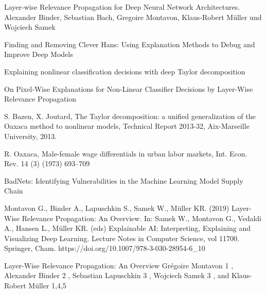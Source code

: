 \documentclass{article}
\theoremstyle{break}
\begin{document}
	\newpage
	\begin{thebibliography}{}
		 Layer-wise Relevance Propagation for Deep
		Neural Network Architectures. Alexander Binder, Sebastian Bach, Gregoire Montavon, Klaus-Robert Müller und Wojciech Samek
		
		Finding and Removing Clever Hans:
		Using Explanation Methods to Debug and Improve Deep Models
		
		 Explaining nonlinear classification decisions with deep Taylor
		decomposition
		
		 On Pixel-Wise Explanations for Non-Linear
		Classifier Decisions by Layer-Wise Relevance
		Propagation
		
		 S. Bazen, X. Joutard, The Taylor decomposition: a unified generalization of the
		Oaxaca method to nonlinear models, Technical Report 2013-32, Aix-Marseille
		University, 2013.
		
		 R. Oaxaca, Male-female wage differentials in urban labor markets, Int. Econ. Rev.
		14 (3) (1973) 693–709
		
		 BadNets: Identifying Vulnerabilities in the Machine Learning Model Supply Chain
		
		Montavon G., Binder A., Lapuschkin S., Samek W., Müller KR. (2019) Layer-Wise Relevance Propagation: An Overview. In: Samek W., Montavon G., Vedaldi A., Hansen L., Müller KR. (eds) Explainable AI: Interpreting, Explaining and Visualizing Deep Learning. Lecture Notes in Computer Science, vol 11700. Springer, Cham. https://doi.org/10.1007/978-3-030-28954-6\_10
		
		 Layer-Wise Relevance Propagation:
		An Overview
		Grégoire Montavon 1 , Alexander Binder 2 , Sebastian Lapuschkin 3 , Wojciech
		Samek 3 , and Klaus-Robert Müller 1,4,5
		
				
	\end{thebibliography}

	
	
\end{document}
